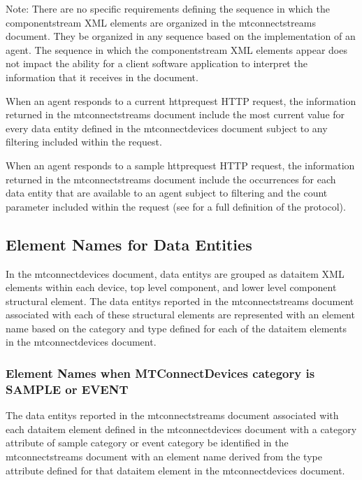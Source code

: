 \begin{note}
Note: There are no specific requirements defining the sequence in which the \gls{componentstream} XML elements are organized in the \gls{mtconnectstreams} document.  They \may be organized in any sequence based on the implementation of an \gls{agent}.  The sequence in which the \gls{componentstream} XML elements appear does not impact the ability for a client software application to interpret the information that it receives in the document.

\end{note}

When an \gls{agent} responds to a  \gls{current httprequest} HTTP request, the information returned in the \gls{mtconnectstreams} document \must include the most current value for every \gls{data entity} defined in the \gls{mtconnectdevices} document subject to any filtering included within the request.

When an \gls{agent} responds to a \gls{sample httprequest} HTTP request, the information returned in the \gls{mtconnectstreams} document \must include the occurrences for each \gls{data entity} that are available to an \gls{agent} subject to filtering and the count parameter included within the request (see  for a full definition of the protocol). 

\subsection{Element Names for Data Entities}

In the \gls{mtconnectdevices} document, \glspl{data entity} are grouped as \gls{dataitem} XML elements within each \gls{device}, \gls{top level} \gls{component}, and \gls{lower level} \gls{component} \gls{structural element}.  The \glspl{data entity} reported in the \gls{mtconnectstreams} document associated with each of these \glspl{structural element} are represented with an \gls{element name} based on the \gls{category} and \gls{type} defined for each of the \gls{dataitem} elements in the \gls{mtconnectdevices} document.

\subsubsection{Element Names when MTConnectDevices category is SAMPLE or EVENT}

The \glspl{data entity} reported in the \gls{mtconnectstreams} document associated with each \gls{dataitem} element defined in the \gls{mtconnectdevices} document with a \gls{category} attribute of \gls{sample category} or \gls{event category} \must be identified in the \gls{mtconnectstreams} document with an \gls{element name} derived from the \gls{type} attribute defined for that \gls{dataitem} element in the \gls{mtconnectdevices} document.

